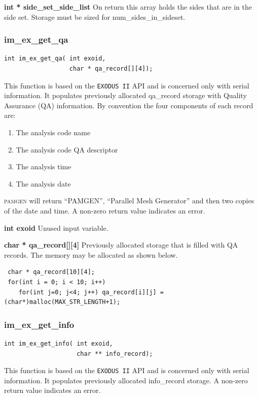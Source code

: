 {\setlength{\parindent}{0pt}
 \textbf{int * side\_set\_side\_list}  On return this array holds the sides that are in the side set.  Storage must be sized for num\_sides\_in\_sideset.}


\subsubsection{im\_ex\_get\_qa}
{\ttfamily  \begin{verbatim}
int im_ex_get_qa( int exoid,
                  char * qa_record[][4]);
\end{verbatim}}
This function is based on the \texttt{EXODUS II} API and is concerned only with serial information. It populates previously allocated qa\_record storage with Quality Assurance (QA) information. By convention the four components of each record are:

\begin{enumerate}\addtolength{\itemsep}{-0.5\baselineskip}
  \item The analysis code name\par
  \item The analysis code QA descriptor\par
  \item The analysis time
  \item The analysis date
\end{enumerate}
\textsc{pamgen} will return ``PAMGEN'', ``Parallel Mesh Generator'' and then two copies of the date and time. A non-zero return value indicates an error.

{\setlength{\parindent}{0pt}
 \textbf{int exoid} Unused input variable.}

{\setlength{\parindent}{0pt}
 \textbf{char * qa\_record[][4]} Previously allocated storage that is filled with QA records. The memory may be allocated as shown below.}
{\ttfamily  \begin{verbatim}
 char * qa_record[10][4];
 for(int i = 0; i < 10; i++)
    for(int j=0; j<4; j++) qa_record[i][j] = (char*)malloc(MAX_STR_LENGTH+1);
\end{verbatim}}

\subsubsection{im\_ex\_get\_info}
{\ttfamily  \begin{verbatim}
int im_ex_get_info( int exoid,
                    char ** info_record);
\end{verbatim}}
This function is based on the \texttt{EXODUS II} API and is concerned only with serial information. It populates previously allocated info\_record storage. A non-zero return value indicates an error.


